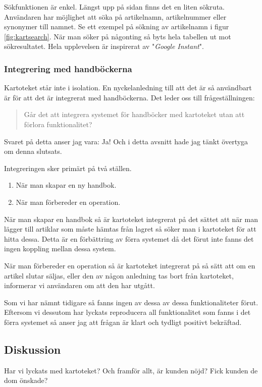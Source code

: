 Sökfunktionen är enkel.
Längst upp på sidan finns det en liten sökruta.
Användaren har möjlighet att söka på artikelnamn, artikelnummer
eller synonymer till namnet. Se ett exempel på sökning
av artikelnamn i figur \ref{fig:kartsearch}.
När man söker på någonting så byts hela tabellen ut mot sökresultatet.
Hela upplevelsen är inspirerat av "\textit{Google Instant}".

\clearpage
\subsubsection{Integrering med handböckerna}
Kartoteket står inte i isolation.
En nyckelanledning till att det är så användbart är
för att det är integrerat med handböckerna.
Det leder oss till frågeställningen:
\begin{quote}
  Går det att integrera systemet för handböcker med kartoteket utan att förlora funktionalitet?
\end{quote}
Svaret på detta anser jag vara: Ja!
Och i detta avsnitt hade jag tänkt övertyga om denna slutsats.

Integreringen sker primärt på två ställen.
\begin{enumerate}
  \item När man skapar en ny handbok.
  \item När man förbereder en operation.
\end{enumerate}

När man skapar en handbok så är kartoteket integrerat på det sättet att
när man lägger till artiklar som måste hämtas från lagret så söker man
i kartoteket för att hitta dessa. Detta är en förbättring av förra
systemet då det förut inte fanns det ingen koppling mellan dessa system.

När man förbereder en operation så är kartoteket integrerat på
så sätt att om en artikel slutar säljas, eller den av någon anledning
tas bort från kartoteket, informerar vi användaren om att den
har utgått.

Som vi har nämnt tidigare så fanns ingen av dessa av dessa funktionaliteter
förut. Eftersom vi dessutom har lyckats reproducera all funktionalitet
som fanns i det förra systemet så anser jag att frågan är klart och
tydligt positivt bekräftad.


\subsection{Diskussion}
Har vi lyckats med kartoteket? Och framför allt, är
kunden nöjd? Fick kunden de dom önskade?

